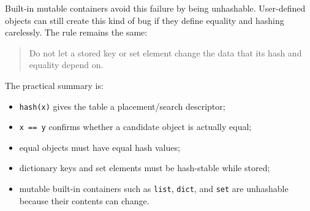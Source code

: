 Built-in mutable containers avoid this failure by being unhashable. User-defined objects can still create this kind of bug if they define equality and hashing carelessly. The rule remains the same:

\begin{quote}
Do not let a stored key or set element change the data that its hash and equality depend on.
\end{quote}

The practical summary is:

\begin{itemize}
    \item \texttt{hash(x)} gives the table a placement/search descriptor;
    \item \texttt{x == y} confirms whether a candidate object is actually equal;
    \item equal objects must have equal hash values;
    \item dictionary keys and set elements must be hash-stable while stored;
    \item mutable built-in containers such as \texttt{list}, \texttt{dict}, and \texttt{set} are unhashable because their contents can change.
\end{itemize}